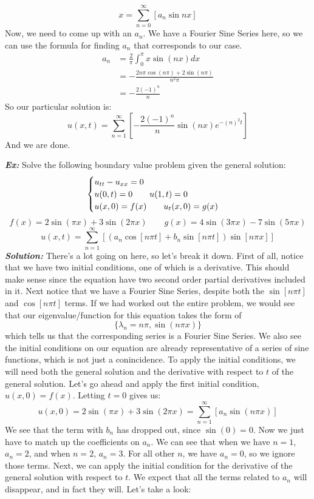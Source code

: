 \documentclass{article}
\begin{document}
\[
x = \sum_{n = 0}^{\infty}\left[a_{n}\sin{nx}\right]
\]
\noindent Now, we need to come up with an $a_{n}$. We have a Fourier Sine Series here, so we can use the formula for finding $a_{n}$ that corresponds to our case.
\begin{align*}
a_{n} &= \frac{2}{\pi}\int_{0}^{\pi} x\sin{\left(nx\right)}dx\\
&= -\frac{2n\pi \cos{\left(n\pi\right)} + 2\sin{\left(n\pi\right)}}{n^{2}\pi}\\
&= -\frac{2(-1)^{n}}{n}
\end{align*}
\noindent So our particular solution is:
\[
u(x,t) = \sum_{n = 1}^{\infty}\left[-\frac{2(-1)^{n}}{n}\sin{\left(n x\right)}e^{-\left(n\right)^{2}t}\right]
\]
\noindent And we are done.


\newpage
\noindent\textbf{\textit{Ex:}} Solve the following boundary value problem given the general solution:
\[
\begin{cases}
u_{tt} - u_{xx} = 0\\
u(0,t) = 0\qquad u(1,t) = 0\\
u(x,0) = f(x)\qquad u_{t}(x,0) = g(x)
\end{cases}\\
\]
\[f(x) = 2\sin{(\pi x)} + 3\sin{(2\pi x)}\qquad g(x) = 4\sin{(3\pi x)} - 7\sin{(5\pi x)}\]
\[u(x,t) = \sum_{n=1}^{\infty}\left[\left(a_{n}\cos{[n\pi t]} + b_{n}\sin{[n\pi t]}\right)\sin{[n\pi x]}\right]\]
\indent\textbf{\textit{Solution:}} There's a lot going on here, so let's break it down. First of all, notice that we have two initial conditions, one of which is a derivative. This should make sense since the equation have two second order partial derivatives included in it. Next notice that we have a Fourier Sine Series, despite both the $\sin{[n\pi t]}$ and $\cos{[n\pi t]}$ terms. If we had worked out the entire problem, we would see that our eigenvalue/function for this equation takes the form of 
\[
\{\lambda_{n} = n\pi, \sin{(n\pi x)}\}
\]
\noindent which tells us that the corresponding series is a Fourier Sine Series. We also see the initial conditions on our equation are already representative of a series of sine functions, which is not just a conincidence. To apply the initial conditions, we will need both the general solution and the derivative with respect to $t$ of the general solution. Let's go ahead and apply the first initial condition, $u(x,0) = f(x)$. Letting $t= 0$ gives us:
\[
u(x,0) = 2\sin{(\pi x)} + 3\sin{(2\pi x)} = \sum_{n=1}^{\infty}\left[a_{n}\sin{(n\pi x)}\right]
\]
\noindent We see that the term with $b_{n}$ has dropped out, since $\sin{(0)} = 0$. Now we just have to match up the coefficients on $a_{n}$. We can see that when we have $n=1$, $a_{n} = 2$, and when $n=2$, $a_{n} = 3$. For all other $n$, we have $a_{n} = 0$, so we ignore those terms. Next, we can apply the initial condition for the derivative of the general solution with respect to $t$. We expect that all the terms related to $a_{n}$ will disappear, and in fact they will. Let's take a look:
\end{document}
